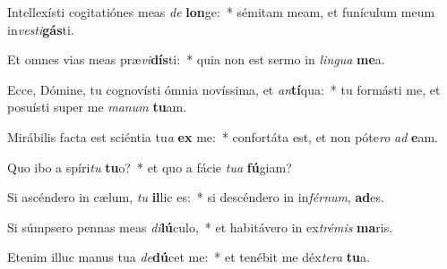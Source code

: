 \item Intellexísti cogitatiónes meas \textit{de} \textbf{lon}ge:~* sémitam meam, et funículum meum in\textit{ves}\textit{ti}\textbf{gás}ti.
\item Et omnes vias meas præ\textit{vi}\textbf{dís}ti:~* quia non est sermo in \textit{lin}\textit{gua} \textbf{me}a.
\item Ecce, Dómine, tu cognovísti ómnia novíssima, et \textit{an}\textbf{tí}qua:~* tu formásti me, et posuísti super me \textit{ma}\textit{num} \textbf{tu}am.
\item Mirábilis facta est sciéntia tu\textit{a} \textbf{ex} me:~* confortáta est, et non póte\textit{ro} \textit{ad} \textbf{e}am.
\item Quo ibo a spíri\textit{tu} \textbf{tu}o?~* et quo a fácie \textit{tu}\textit{a} \textbf{fú}giam?
\item Si ascéndero in cælum, \textit{tu} \textbf{il}lic es:~* si descéndero in in\textit{fér}\textit{num}, \textbf{ad}es.
\item Si súmpsero pennas meas \textit{di}\textbf{lú}culo,~* et habitávero in ex\textit{tré}\textit{mis} \textbf{ma}ris.
\item Etenim illuc manus tua \textit{de}\textbf{dú}cet me:~* et tenébit me déx\textit{te}\textit{ra} \textbf{tu}a.
